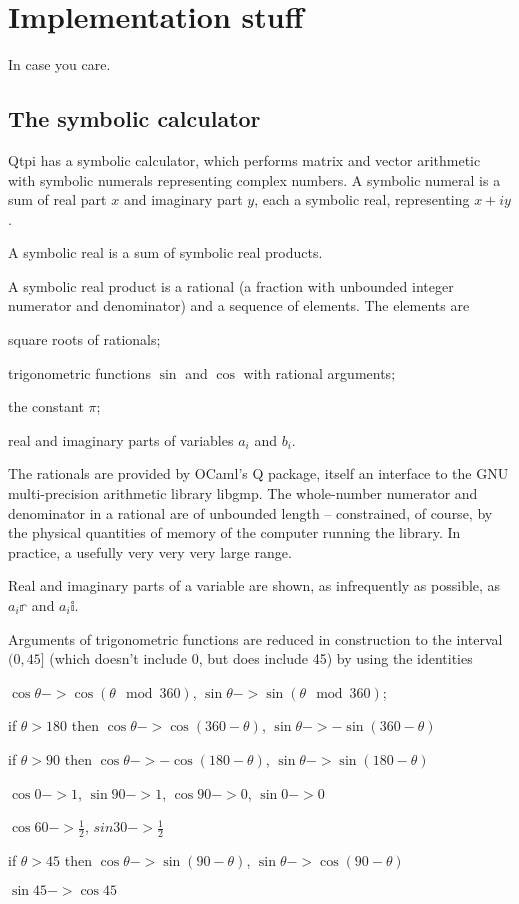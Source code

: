 
\chapter{Implementation stuff}

In case you care.

\section{The symbolic calculator}

Qtpi has a symbolic calculator, which performs matrix and vector arithmetic with symbolic numerals representing complex numbers. A symbolic numeral is a sum of real part $x$ and imaginary part $y$, each a symbolic real, representing $x+iy$.

A symbolic real is a sum of symbolic real products. 

A symbolic real product is a rational (a fraction with unbounded integer numerator and denominator) and a sequence of elements. The elements are 
\begin{itemize*}
\item square roots of rationals;
\item trigonometric functions $\sin{}$ and $\cos{}$ with rational arguments;
\item the constant $\pi$;
\item real and imaginary parts of variables $a_{i}$ and $b_{i}$.
\end{itemize*}

The rationals are provided by OCaml's Q package, itself an interface to the GNU multi-precision arithmetic library libgmp. The whole-number numerator and denominator in a rational are of unbounded length -- constrained, of course, by the physical quantities of memory of the computer running the library.  In practice, a usefully very very very large range.

Real and imaginary parts of a variable are shown, as infrequently as possible, as $a_{i}\mathbb{r}$ and $a_{i}\mathbb{i}$.

Arguments of trigonometric functions are reduced in construction to the interval $(0,45]$ (which doesn't include 0, but does include 45) by using the identities
\begin{itemize*}
\item $\cos\theta->\cos{(\theta\mod360)}$, $\sin\theta->\sin{(\theta\mod360)}$;
\item if $\theta>180$ then $\cos\theta-> \cos{(360-\theta)}$, $\sin\theta-> -\sin{(360-\theta)}$
\item if $\theta>90$ then $\cos\theta-> -\cos{(180-\theta)}$, $\sin\theta-> \sin{(180-\theta)}$
\item $\cos0->1$, $\sin90->1$, $\cos{90}->0$, $\sin0->0$
\item $\cos60->\frac{1}{2}$, $sin30->\frac{1}{2}$
\item if $\theta>45$ then $\cos\theta->\sin{(90-\theta)}$, $\sin\theta->\cos{(90-\theta)}$
\item $\sin45->\cos45$
\end{itemize*}


